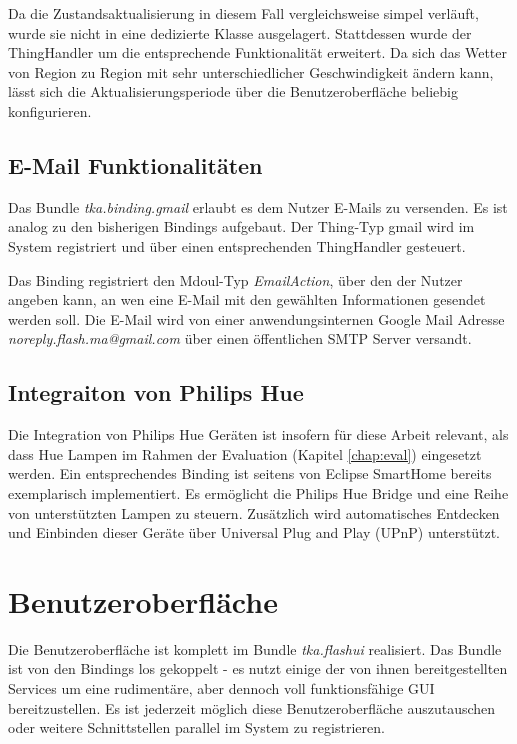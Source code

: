 Da die Zustandsaktualisierung in diesem Fall vergleichsweise simpel verläuft, wurde sie nicht in eine dedizierte Klasse ausgelagert. Stattdessen wurde der ThingHandler um die entsprechende Funktionalität erweitert. Da sich das Wetter von Region zu Region mit sehr unterschiedlicher Geschwindigkeit ändern kann, lässt sich die Aktualisierungsperiode über die Benutzeroberfläche beliebig konfigurieren.


\subsection{E-Mail Funktionalitäten}
Das Bundle \textit{tka.binding.gmail} erlaubt es dem Nutzer E-Mails zu versenden. Es ist analog zu den bisherigen Bindings aufgebaut. Der Thing-Typ \glqq gmail\grqq{} wird im System registriert und über einen entsprechenden ThingHandler gesteuert. 

Das Binding registriert den Mdoul-Typ \textit{EmailAction}, über den der Nutzer angeben kann, an wen eine E-Mail mit den gewählten Informationen gesendet werden soll. Die E-Mail wird von einer anwendungsinternen Google Mail\cite{gmail} Adresse \textit{noreply.flash.ma@gmail.com} über einen öffentlichen SMTP Server versandt.


\subsection{Integraiton von Philips Hue}
Die Integration von Philips Hue Geräten ist insofern für diese Arbeit relevant, als dass Hue Lampen im Rahmen der Evaluation (Kapitel \ref{chap:eval}) eingesetzt werden. Ein entsprechendes Binding ist seitens von Eclipse SmartHome bereits exemplarisch implementiert. Es ermöglicht die Philips Hue Bridge und eine Reihe von unterstützten Lampen zu steuern. Zusätzlich wird automatisches Entdecken und Einbinden dieser Geräte über Universal Plug and Play (UPnP) unterstützt.


\section{Benutzeroberfläche}
Die Benutzeroberfläche ist komplett im Bundle \textit{tka.flashui} realisiert. Das Bundle ist von den Bindings los gekoppelt - es nutzt einige der von ihnen bereitgestellten Services um eine rudimentäre, aber dennoch voll funktionsfähige GUI bereitzustellen. Es ist jederzeit möglich diese Benutzeroberfläche auszutauschen oder weitere Schnittstellen parallel im System zu registrieren.\\

